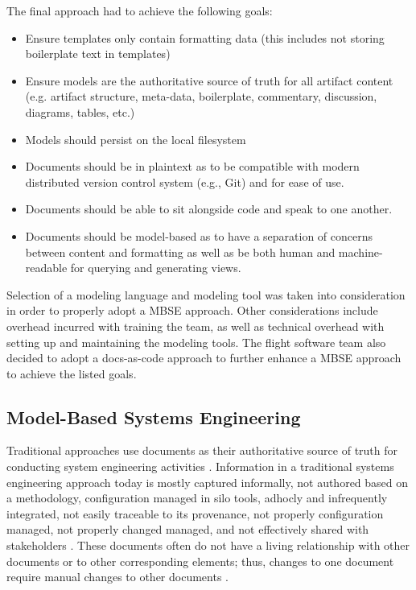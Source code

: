 \documentclass[conf]{new-aiaa}
\begin{document}
The final approach had to achieve the following goals:
\begin{itemize}
    \item Ensure templates only contain formatting data (this includes not storing boilerplate text in templates)
    
    \item Ensure models are the authoritative source of truth for all artifact content (e.g. artifact structure, meta-data, boilerplate, commentary, discussion, diagrams, tables, etc.)
    
    \item Models should persist on the local filesystem
    
    \item Documents should be in plaintext as to be compatible with modern distributed version control system (e.g., Git) and for ease of use.
    
    \item Documents should be able to sit alongside code and speak to one another.
    
    \item Documents should be model-based as to have a separation of concerns between content and formatting as well as be both human and machine-readable for querying and generating views.
\end{itemize}

Selection of a modeling language and modeling tool was taken into consideration in order to properly adopt a MBSE approach. Other considerations include overhead incurred with training the team, as well as technical overhead with setting up and maintaining the modeling tools. The flight software team also decided to adopt a docs-as-code approach to further enhance a MBSE approach to achieve the listed goals.

\subsection{Model-Based Systems Engineering}

Traditional approaches use documents as their authoritative source of truth for conducting system engineering activities \cite{architecting_spacecraft}. Information in a traditional systems engineering approach today is mostly captured informally, not authored based on a methodology, configuration managed in silo tools, adhocly and infrequently integrated, not easily traceable to its provenance, not properly configuration managed, not properly changed managed, and not effectively shared with stakeholders \cite{caesar_model_based_approach}. These documents often do not have a living relationship with other documents or to other corresponding elements; thus, changes to one document require manual changes to other documents \cite{ibm_mbse}.
\end{document}
